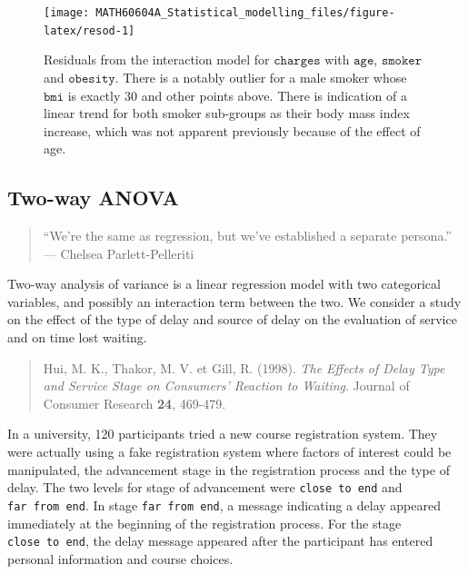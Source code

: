 \documentclass[
  11pt,
  letterpaper,
]{book}
\theoremstyle{definition}
\theoremstyle{definition}
\theoremstyle{definition}
\theoremstyle{definition}
\theoremstyle{remark}
\begin{document}
\begin{figure}

{\centering \texttt{[image: MATH60604A\_Statistical\_modelling\_files/figure-latex/resod-1]} 

}

\caption{Residuals from the interaction model for $\texttt{charges}$ with $\texttt{age}$, $\texttt{smoker}$ and $\texttt{obesity}$. There is a notably outlier for a male smoker whose $\texttt{bmi}$ is exactly 30 and other points above. There is indication of a linear trend for both smoker sub-groups as their body mass index increase, which was not apparent previously because of the effect of age.}\label{fig:resod}
\end{figure}

\hypertarget{two-way-anova}{%
\subsection{Two-way ANOVA}\label{two-way-anova}}

\begin{quote}
``We're the same as regression, but we've established a separate persona.'' --- Chelsea Parlett-Pelleriti
\end{quote}

Two-way analysis of variance is a linear regression model with two categorical variables, and possibly an interaction term between the two. We consider a study on the effect of the type of delay and source of delay on the evaluation of service and on time lost waiting.

\begin{quote}
Hui, M. K., Thakor, M. V. et Gill, R. (1998). \emph{The Effects of Delay Type and Service Stage on Consumers' Reaction to Waiting}. Journal of Consumer Research \textbf{24}, 469-479.
\end{quote}

In a university, 120 participants tried a new course registration system. They were actually using a fake registration system where factors of interest could be manipulated, the advancement stage in the registration process and the type of delay. The two levels for stage of advancement were \texttt{close\ to\ end} and \texttt{far\ from\ end}. In stage \texttt{far\ from\ end}, a message indicating a delay appeared immediately at the beginning of the registration process. For the stage \texttt{close\ to\ end}, the delay message appeared after the participant has entered personal information and course choices.
\end{document}
